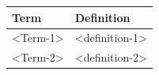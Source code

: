 \begin{longtable}[]{@{}ll@{}}
\toprule
\begin{minipage}[b]{0.47\columnwidth}\raggedright\strut
Term\strut
\end{minipage} & \begin{minipage}[b]{0.47\columnwidth}\raggedright\strut
Definition\strut
\end{minipage}\tabularnewline
\midrule
\endhead
\begin{minipage}[t]{0.47\columnwidth}\raggedright\strut
\textless{}Term-1\textgreater{}\strut
\end{minipage} & \begin{minipage}[t]{0.47\columnwidth}\raggedright\strut
\textless{}definition-1\textgreater{}\strut
\end{minipage}\tabularnewline
\begin{minipage}[t]{0.47\columnwidth}\raggedright\strut
\textless{}Term-2\textgreater{}\strut
\end{minipage} & \begin{minipage}[t]{0.47\columnwidth}\raggedright\strut
\textless{}definition-2\textgreater{}\strut
\end{minipage}\tabularnewline
\bottomrule
\end{longtable}
